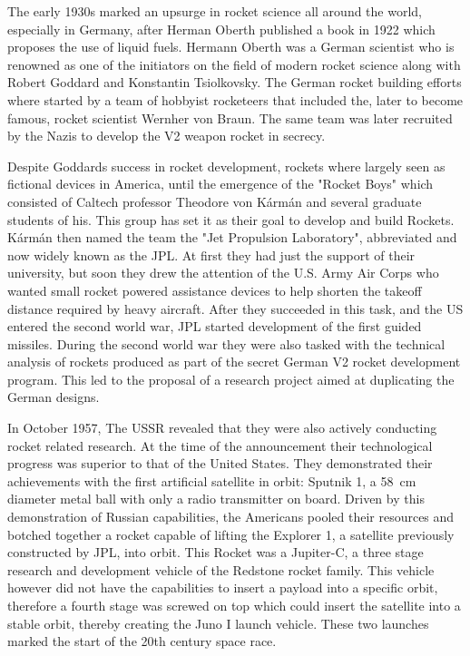 The early 1930s marked an upsurge in rocket science all around the world, especially in Germany, after Herman Oberth published a book in 1922 which proposes the use of liquid fuels. Hermann Oberth was a German scientist who is renowned as one of the initiators on the field of modern rocket science along with Robert Goddard and Konstantin Tsiolkovsky. The German rocket building efforts where started by a team of hobbyist rocketeers that included the, later to become famous, rocket scientist Wernher von Braun. The same team was later recruited by the Nazis to develop the V2 weapon rocket in secrecy.

Despite Goddards success in rocket development, rockets where largely seen as fictional devices in America, until the emergence of the "Rocket Boys" which consisted of Caltech professor Theodore von Kármán and several graduate students of his. This group has set it as their goal to develop and build Rockets. Kármán then named the team the "Jet Propulsion Laboratory", abbreviated and now widely known as the JPL. At first they had just the support of their university, but soon they drew the attention of the U.S. Army Air Corps who wanted small rocket powered assistance devices to help shorten the takeoff distance required by heavy aircraft. After they succeeded in this task, and the US entered the second world war, JPL started development of the first guided missiles. During the second world war they were also tasked with the technical analysis of rockets produced as part of the secret German V2 rocket development program. This led to the proposal of a research project aimed at duplicating the German designs.

In October 1957, The USSR revealed that they were also actively conducting rocket related research. At the time of the announcement their technological progress was superior to that of the United States. They demonstrated their achievements with the first artificial satellite in orbit: Sputnik 1, a \SI{58}{\centi\meter} diameter metal ball with only a radio transmitter on board. Driven by this demonstration of Russian capabilities, the Americans pooled their resources and botched together a rocket capable of lifting the Explorer 1, a satellite previously constructed by JPL, into orbit. This Rocket was a Jupiter-C, a three stage research and development vehicle of the Redstone rocket family. This vehicle however did not have the capabilities to insert a payload into a specific orbit, therefore a fourth stage was screwed on top which could insert the satellite into a stable orbit, thereby creating the Juno I launch vehicle. These two launches marked the start of the 20th century space race.

